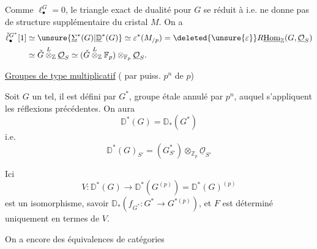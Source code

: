 Comme $\ell_\bullet^G=0$, le triangle exact de dualité pour $G$
se réduit à
i.e. ne donne pas de structure supplémentaire
 
du cristal $M$. On a
\[
\begin{aligned}
\check\ell_\bullet^{G^*}[1]
&\simeq\unsure{\underline{\Sigma}^*(G)|\underline{\mathbb D}^*(G)}
\simeq\varepsilon^*(M_{/p})
=\deleted{\unsure{\varepsilon}}
R\underline{\operatorname{Hom}}_{\mathbb Z}(G,\underline{\mathcal O}_S)\\
&\simeq\check G\overset L\otimes_{\mathbb Z}\underline{\mathcal O}_S
\simeq(\check G\overset L\otimes_{\mathbb Z}\mathbb F_p)
\otimes_{\mathbb F_p}\underline{\mathcal O}_S.
\end{aligned}
\]

\uline{Groupes de type multiplicatif}
( par puiss. $p^n$ de $p$)

Soit $G$  un tel, il est défini par $G^*$,
groupe étale annulé par $p^n$, auquel s'appliquent les réflexions
précédentes. On aura
\[
\mathbb D^*(G)=\mathbb D_*(G^*)
\]
i.e.
\[
\mathbb D^*(G)_{S'}=(G^*_{S'})\otimes_{\mathbb Z_p}
\underline{\mathcal O}_{S'}
\]

Ici
\[
V:\mathbb D^*(G)\longrightarrow\mathbb D^*(G^{(p)})
=\mathbb D^*(G)^{(p)}
\]
est un isomorphisme, savoir
$\mathbb D_*(f_{G^*}:G^*\longrightarrow G^{*(p)})$,
et $F$ est  déterminé uniquement en termes de $V$.

On a encore des équivalences de catégories
